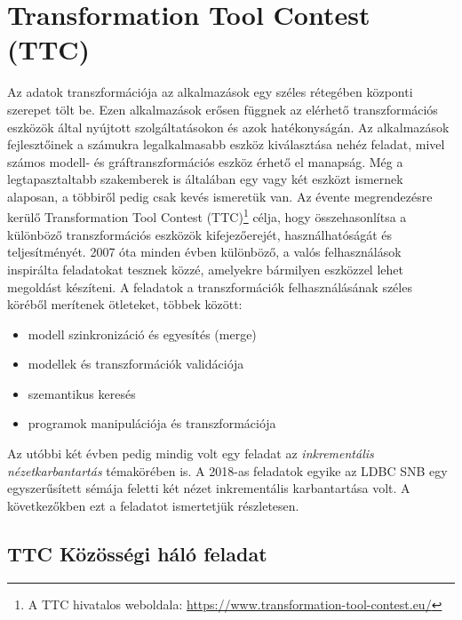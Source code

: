 \chapter{Transformation Tool Contest (TTC)}
\label{sec:ttc}

\newcommand{\ttcyedscale}{0.55}

Az adatok transzformációja az alkalmazások egy széles rétegében központi szerepet tölt be. Ezen alkalmazások erősen függnek az elérhető transzformációs eszközök által nyújtott szolgáltatásokon és azok hatékonyságán. Az alkalmazások fejlesztőinek a számukra legalkalmasabb eszköz kiválasztása nehéz feladat, mivel számos modell- és gráftranszformációs eszköz érhető el manapság. Még a legtapasztaltabb szakemberek is általában egy vagy két eszközt ismernek alaposan, a többiről pedig csak kevés ismeretük van.
Az évente megrendezésre kerülő Transformation Tool Contest (TTC)\footnote{A TTC hivatalos weboldala: \url{https://www.transformation-tool-contest.eu/}} célja, hogy összehasonlítsa a különböző transzformációs eszközök kifejezőerejét, használhatóságát és teljesítményét. 2007 óta minden évben különböző, a valós felhasználások inspirálta feladatokat tesznek közzé, amelyekre bármilyen eszközzel lehet megoldást készíteni. A feladatok a transzformációk felhasználásának széles köréből merítenek ötleteket, többek között:
\begin{itemize}
	\item modell szinkronizáció és egyesítés (merge)
	\item modellek és transzformációk validációja
	\item szemantikus keresés
	\item programok manipulációja és transzformációja
\end{itemize}
Az utóbbi két évben pedig mindig volt egy feladat az \emph{inkrementális nézetkarbantartás} témakörében is. A 2018-as feladatok egyike az LDBC SNB egy egyszerűsített sémája feletti két nézet inkrementális karbantartása volt. A következőkben ezt a feladatot ismertetjük részletesen.

\section{TTC Közösségi háló feladat}

